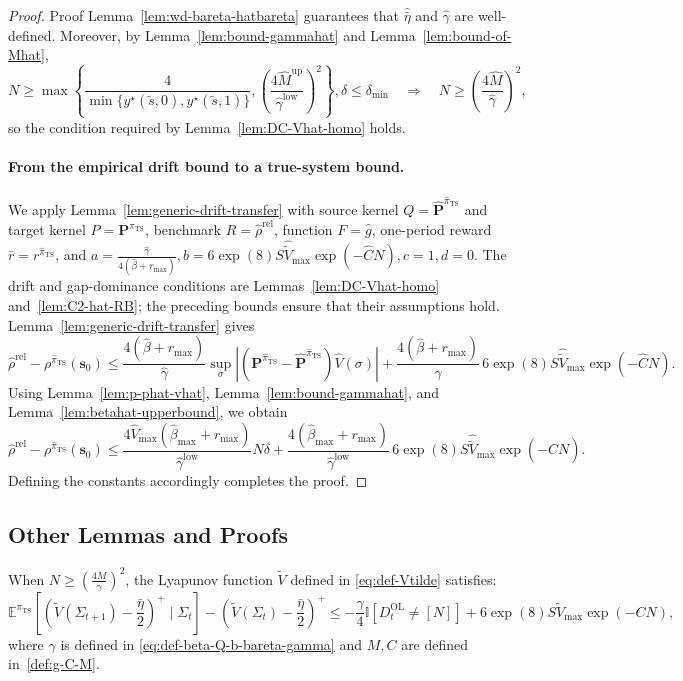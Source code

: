 \documentclass[mnsc,nonblindrev]{informs3}
\newcommand{\E}{\mathbb{E}}
\newcommand{\lbgmhat}{\widehat{\gamma}^{\mathrm{low}}}
\newcommand{\ubmhat}{\widehat{M}^{\mathrm{up}}}
\newcommand{\Vhat}{\widehat{V}}
\newcommand{\bp}{\bm{P}}
\newcommand{\bphat}{\widehat{\bm{P}}}
\newcommand{\pits}{\pi_{\mathrm{TS}}}
\newcommand{\pihts}{\widehat{\pi}_{\mathrm{TS}}}
\newcommand{\bms}{\bm{s}}
\newcommand{\rhohrel}{\widehat{\rho}^{\mathrm{rel}}}
\begin{document}
\begin{APPENDICES}
\begin{proof}{Proof}
Lemma~\ref{lem:wd-bareta-hatbareta} guarantees that $\widehat{\bar\eta}$ and $\widehat \gamma$ are well-defined.
Moreover, by Lemma~\ref{lem:bound-gammahat} and Lemma~\ref{lem:bound-of-Mhat},
\[
    N\ge\max\left\{\frac{4}{\min\{y^\star(\tilde{s},0),y^\star(\tilde{s},1)\}},\left(\frac{4\ubmhat}{\lbgmhat}\right)^2\right\},\delta\le\delta_{\min}
    \quad \Longrightarrow \quad
    N\ge\left(\frac{4\widehat M}{\widehat \gamma}\right)^2,
\]
so the condition required by Lemma~\ref{lem:DC-Vhat-homo} holds.

\paragraph{From the empirical drift bound to a true-system bound.}
We apply Lemma~\ref{lem:generic-drift-transfer} with source kernel $Q=\bphat^{\pihts}$ and target kernel $P=\bp^{\pihts}$, benchmark $R=\rhohrel$, function $F=\widehat g$, one-period reward $\bar r=r^{\pihts}$, and \(a=\frac{\widehat\gamma}{4(\widehat\beta+r_{\max})}, b=6\exp(8)S\widehat{\tilde V}_{\max}\exp(-\widehat C N), c=1, d=0.\)
The drift and gap-dominance conditions are Lemmas~\ref{lem:DC-Vhat-homo} and~\ref{lem:C2-hat-RB}; the preceding bounds ensure that their assumptions hold. Lemma~\ref{lem:generic-drift-transfer} gives
\[
    \rhohrel-\rho^{\pihts}(\bms_0)
    \le
    \frac{4(\widehat\beta+r_{\max})}{\widehat\gamma}\sup_\sigma |(\bp^{\pihts}-\bphat^{\pihts})\Vhat(\sigma)|
    +\frac{4(\widehat\beta+r_{\max})}{\widehat\gamma}\,6\exp(8)S\widehat{\tilde V}_{\max}\exp(-\widehat C N).
\]
Using Lemma~\ref{lem:p-phat-vhat}, Lemma~\ref{lem:bound-gammahat}, and Lemma~\ref{lem:betahat-upperbound}, we obtain
\[
    \rhohrel-\rho^{\pihts}(\bms_0)
    \le
    \frac{4\Vhat_{\max}(\widehat\beta_{\max}+r_{\max})}{\lbgmhat}N\delta
    +\frac{4(\widehat\beta_{\max}+r_{\max})}{\lbgmhat}\,6\exp(8)S\widehat{\tilde V}_{\max}\exp(-\widehat C N).
\]
Defining the constants accordingly completes the proof.
\end{proof}



\subsection{Other Lemmas and Proofs}\label{subsec:other-lem-pf-homo}

\begin{lemma}\label{lem:drift-fV}
    When $N\ge\left(\frac{4M}{\gamma}\right)^2$, the Lyapunov function $\tilde V$ defined in \eqref{eq:def-Vtilde} satisfies:
    \[
    \E^{\pits}\left[\left(\tilde V(\Sigma_{t+1})-\frac{\bar\eta}{2}\right)^+\mid \Sigma_t 
        \right]-\left(\tilde V(\Sigma_t)-\frac{\bar\eta}{2}\right)^+\le-\frac{\gamma}{4}\mathbb{I}[D_t^{\mathrm{OL}}\neq [N]]+6\exp(8)S\tilde{V}_{\max}\exp(-CN),
    \]
    where $\gamma$ is defined in \eqref{eq:def-beta-Q-b-bareta-gamma} and $M,C$ are defined in~\eqref{def:g-C-M}.
\end{lemma}


\end{APPENDICES}
\end{document}
